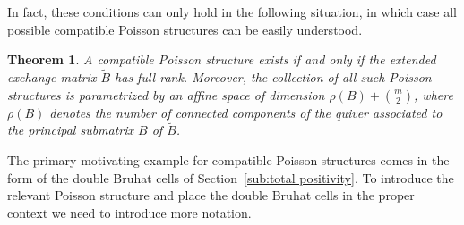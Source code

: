 \documentclass{amsart}
\newtheorem{theorem}{Theorem}[section]
\theoremstyle{definition}
\theoremstyle{remark}
\numberwithin{equation}{section}
\begin{document}
  In fact, these conditions can only hold in the following situation, in which case all possible compatible Poisson structures can be easily understood. 
  \begin{theorem}\cite{GSV03} \label{thm:Poisson}
    A compatible Poisson structure exists if and only if the extended exchange matrix $\tilde B$ has full rank.  Moreover, the collection of all such Poisson structures is parametrized by an affine space of dimension $\rho(B)+{m\choose 2}$, where $\rho(B)$ denotes the number of connected components of the quiver associated to the principal submatrix $B$ of $\tilde B$.
  \end{theorem}
  The primary motivating example for compatible Poisson structures comes in the form of the double Bruhat cells of Section~\ref{sub:total positivity}.  To introduce the relevant Poisson structure and place the double Bruhat cells in the proper context we need to introduce more notation.
\end{document}
